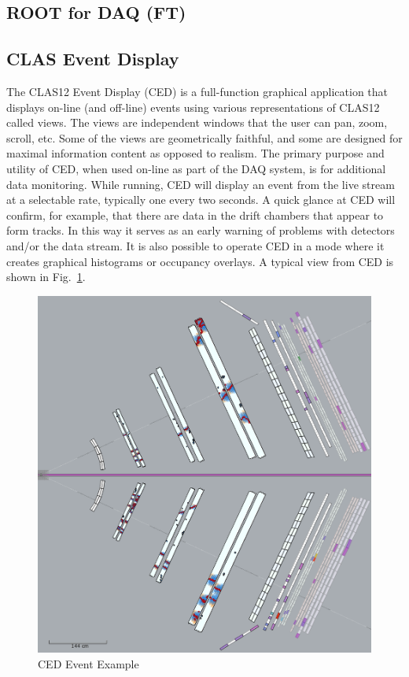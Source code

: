 \subsection{ROOT for DAQ (FT)}




\subsection{CLAS Event Display}

The CLAS12 Event Display (CED) is a full-function graphical application that displays on-line (and off-line) events using various representations of CLAS12 called views. The views are independent windows that the user can pan, zoom, scroll, etc. Some of the views are geometrically faithful, and some are designed for maximal information content as opposed to realism. The primary purpose and utility of CED, when used on-line as part of the DAQ system, is for additional data monitoring. While running, CED will display an event from the live stream at a selectable rate, typically one every two seconds. A quick glance at CED will confirm, for example, that there are data in the drift chambers that appear to form tracks. In this way it serves as an early warning of problems with detectors and/or the data stream. It is also possible to operate CED in a mode where it creates graphical histograms or occupancy overlays. A typical view from CED is shown in Fig.~\ref{fig:ced}.

\begin{figure}[hbt]
	\centering
	\includegraphics[width=1.0\columnwidth,keepaspectratio]{img/ced.png}
	\caption{CED Event Example}
	\label{fig:ced}
\end{figure}
